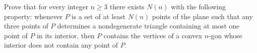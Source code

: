 Prove that for every integer $n\ge 3$ there exists $N(n)$ with the following property: whenever $P$ is a set of at least $N(n)$ points of the plane such that any three points of $P$ determines a nondegenerate triangle containing at most one point of $P$ in its interior, then $P$ contains the vertices of a convex $n$-gon whose interior does not contain any point of $P$.